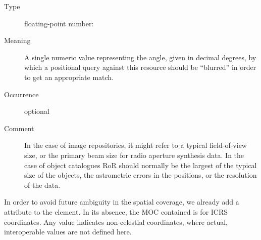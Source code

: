 \documentclass[11pt,a4paper]{ivoa}
\begin{document}
\begin{generated}
\begin{bigdescription}
\begin{description}
\end{description}
\item[Element \xmlel{regionOfRegard}]
\begin{description}
\item[Type] floating-point number: 
\item[Meaning] A single numeric value representing the angle, given
                  in decimal degrees, by which a positional query
                  against this resource should be “blurred” in order
                  to get an appropriate match.
\item[Occurrence] optional
\item[Comment] In the case of image repositories, it might refer to
                  a typical field-of-view size, or the primary beam
                  size for radio aperture synthesis data.  In the case
                  of object catalogues RoR should normally be the
                  largest of the typical size of the objects, the
                  astrometric errors in the positions, or the
                  resolution of the data.

\end{description}


\end{bigdescription}\endgroup

\endgroup
\end{generated}


In order to avoid future ambiguity in the spatial coverage, we already
add a  attribute to the  element.  In its
absence, the MOC contained is for ICRS coordinates.  Any value indicates
non-celestial coordinates, where actual, interoperable values are not
defined here.
\end{document}
